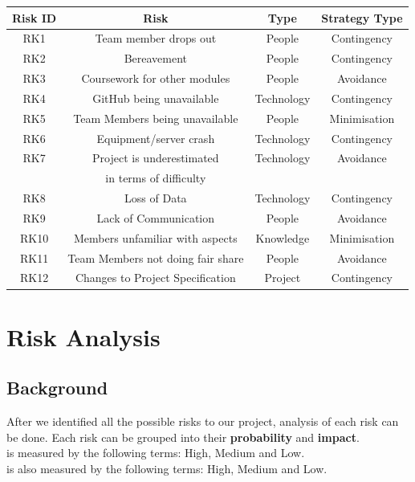 \documentclass[11pt, a4paper]{report}
\begin{document}
		
	\begin{tabular}{ |c|c|c|c| }
		\hline
		\textbf{Risk ID} & \textbf{Risk} & \textbf{Type} & \textbf{Strategy Type} \\
		\hline
		RK1 & Team member drops out & People & Contingency \\
		\hline
		RK2 & Bereavement & People & Contingency \\
		\hline
		RK3 & Coursework for other modules & People & Avoidance \\
		\hline
		RK4 & GitHub being unavailable & Technology & Contingency \\
		\hline
		RK5 & Team Members being unavailable & People & Minimisation \\
		\hline
		RK6 & Equipment/server crash & Technology & Contingency \\
		\hline
		RK7 & Project is underestimated & Technology & Avoidance \\
		&in terms of difficulty&&\\
		\hline
		RK8 & Loss of Data & Technology & Contingency \\
		\hline
		RK9 & Lack of Communication & People & Avoidance \\
		\hline
		RK10 & Members unfamiliar with aspects & Knowledge & Minimisation  \\
		\hline
		RK11 & Team Members not doing fair share & People & Avoidance \\
		\hline
		RK12 & Changes to Project Specification & Project & Contingency \\
		\hline
	\end{tabular}


\section{Risk Analysis}

\subsection{Background}

After we identified all the possible risks to our project, analysis of each risk can be done. Each risk can be grouped into their {\bfseries probability} and {\bfseries impact}.\\

 is measured by the following terms: High, Medium and Low.\\

 is also measured by the following terms: High, Medium and Low.\\
\end{document}
